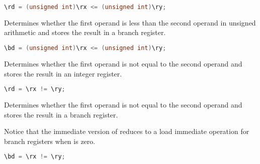 \begin{lstlisting}[numbers=none, basicstyle=\ttfamily\footnotesize, language=C++]
\rd = (unsigned int)\rx <= (unsigned int)\ry;
\end{lstlisting}

Determines whether the first operand is less than the second operand in unsigned
arithmetic and stores the result in a branch register.

\begin{lstlisting}[numbers=none, basicstyle=\ttfamily\footnotesize, language=C++]
\bd = (unsigned int)\rx <= (unsigned int)\ry;
\end{lstlisting}

Determines whether the first operand is not equal to the second operand and
stores the result in an integer register.

\begin{lstlisting}[numbers=none, basicstyle=\ttfamily\footnotesize, language=C++]
\rd = \rx != \ry;
\end{lstlisting}

Determines whether the first operand is not equal to the second operand and
stores the result in a branch register.

Notice that the immediate version of  reduces to a load immediate
operation for branch registers when  is zero.

\begin{lstlisting}[numbers=none, basicstyle=\ttfamily\footnotesize, language=C++]
\bd = \rx != \ry;
\end{lstlisting}
